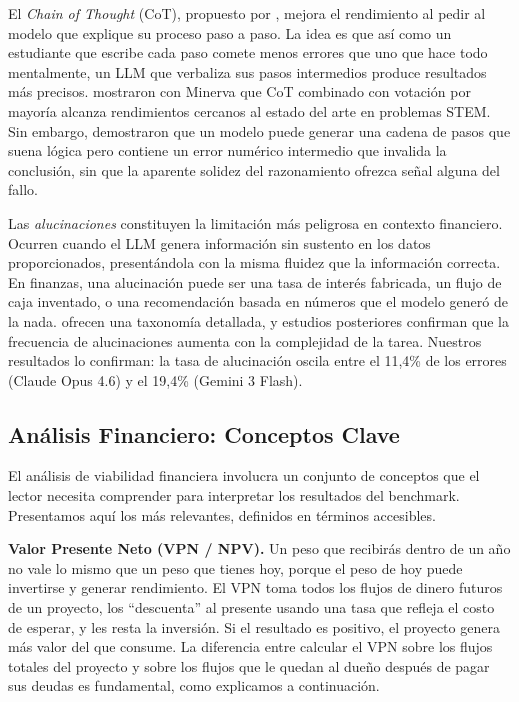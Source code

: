 \documentclass[12pt,a4paper]{article}
\begin{document}
El \textit{Chain of Thought} (CoT), propuesto por \citet{Wei2022}, mejora el rendimiento al pedir al modelo que explique su proceso paso a paso. La idea es que así como un estudiante que escribe cada paso comete menos errores que uno que hace todo mentalmente, un LLM que verbaliza sus pasos intermedios produce resultados más precisos. \citet{Lewkowycz2022} mostraron con Minerva que CoT combinado con votación por mayoría alcanza rendimientos cercanos al estado del arte en problemas STEM. Sin embargo, \citet{Lightman2023} demostraron que un modelo puede generar una cadena de pasos que suena lógica pero contiene un error numérico intermedio que invalida la conclusión, sin que la aparente solidez del razonamiento ofrezca señal alguna del fallo.

Las \textit{alucinaciones} constituyen la limitación más peligrosa en contexto financiero. Ocurren cuando el LLM genera información sin sustento en los datos proporcionados, presentándola con la misma fluidez que la información correcta. En finanzas, una alucinación puede ser una tasa de interés fabricada, un flujo de caja inventado, o una recomendación basada en números que el modelo generó de la nada. \citet{Huang2024} ofrecen una taxonomía detallada, y estudios posteriores confirman que la frecuencia de alucinaciones aumenta con la complejidad de la tarea. Nuestros resultados lo confirman: la tasa de alucinación oscila entre el 11,4\% de los errores (Claude Opus 4.6) y el 19,4\% (Gemini 3 Flash).

\subsection{Análisis Financiero: Conceptos Clave}

El análisis de viabilidad financiera involucra un conjunto de conceptos que el lector necesita comprender para interpretar los resultados del benchmark. Presentamos aquí los más relevantes, definidos en términos accesibles.

\textbf{Valor Presente Neto (VPN / NPV).} Un peso que recibirás dentro de un año no vale lo mismo que un peso que tienes hoy, porque el peso de hoy puede invertirse y generar rendimiento. El VPN toma todos los flujos de dinero futuros de un proyecto, los ``descuenta'' al presente usando una tasa que refleja el costo de esperar, y les resta la inversión. Si el resultado es positivo, el proyecto genera más valor del que consume. La diferencia entre calcular el VPN sobre los flujos totales del proyecto y sobre los flujos que le quedan al dueño después de pagar sus deudas es fundamental, como explicamos a continuación.
\end{document}
